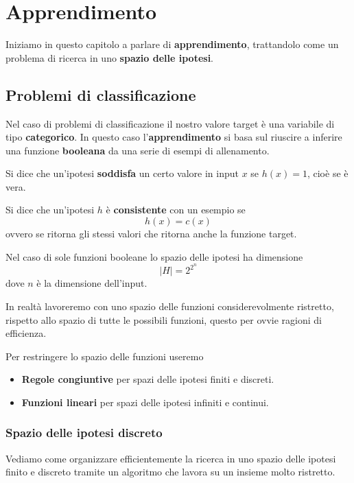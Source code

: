 \chapter{Apprendimento}
Iniziamo in questo capitolo a parlare di \textbf{apprendimento}, trattandolo come un problema di ricerca in uno
\textbf{spazio delle ipotesi}.

\section{Problemi di classificazione}
Nel caso di problemi di classificazione il nostro valore target \`e una variabile di tipo \textbf{categorico}. In questo
caso l'\textbf{apprendimento} si basa sul riuscire a inferire una funzione \textbf{booleana} da una serie di
esempi di allenamento.

\begin{definition}
	Si dice che un'ipotesi \textbf{soddisfa} un certo valore in input $x$ se $h(x) = 1$, cio\`e se \`e vera.
\end{definition}

\begin{definition}\label{def: consistente}
	Si dice che un'ipotesi $h$ \`e \textbf{consistente} con un esempio se
	\[ h(x) = c(x) \]
	ovvero se ritorna gli stessi valori che ritorna anche la funzione target.
\end{definition}

Nel caso di sole funzioni booleane lo spazio delle ipotesi ha dimensione
\[ |H| = 2^{2^n} \]
dove $n$ \`e la dimensione dell'input.

In realt\`a lavoreremo con uno spazio delle funzioni considerevolmente ristretto, rispetto allo spazio di tutte le
possibili funzioni, questo per ovvie ragioni di efficienza.

Per restringere lo spazio delle funzioni useremo
\begin{itemize}
	\item \textbf{Regole congiuntive} per spazi delle ipotesi finiti e discreti.
	\item \textbf{Funzioni lineari} per spazi delle ipotesi infiniti e continui.
\end{itemize}

\subsection{Spazio delle ipotesi discreto}
Vediamo come organizzare efficientemente la ricerca in uno spazio delle ipotesi finito e discreto tramite un algoritmo che
lavora su un insieme molto ristretto.


